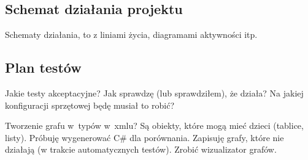 %
%
%
%
%
%
%
%
%
%

\subsection{Schemat działania projektu}
Schematy działania, to z liniami życia, diagramami aktywności itp.

\subsection{Plan testów}
Jakie testy akceptacyjne? Jak sprawdzę (lub sprawdziłem), że działa? Na jakiej konfiguracji sprzętowej będę musiał to robić?

Tworzenie grafu w~typów w~xmlu? Są obiekty, które mogą mieć dzieci (tablice, listy). Próbuję wygenerować C\# dla porównania. Zapisuję grafy, które nie działają (w trakcie automatycznych testów). Zrobić wizualizator grafów.

